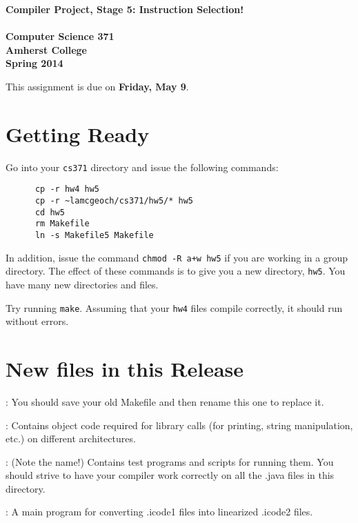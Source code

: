 \documentclass[11pt]{article}
\begin{document}
\begin{center}
\Large \bf Compiler Project, Stage 5: Instruction Selection!\\ \mbox{} \\
\large Computer Science 371 \\
\large Amherst College \\
\large Spring 2014
\end{center}

This assignment is due on {\bf Friday, May 9}.

\section{Getting Ready}

Go into your \verb'cs371' directory and issue the following commands:
\begin{verbatim}
      cp -r hw4 hw5          
      cp -r ~lamcgeoch/cs371/hw5/* hw5
      cd hw5
      rm Makefile
      ln -s Makefile5 Makefile
\end{verbatim}
In addition, issue the command \verb'chmod -R a+w hw5' if you are working in a group directory.
The effect of these commands is to give you a new directory, \verb'hw5'.  You have many new directories and files.

Try running \verb'make'.  Assuming that your \verb'hw4' files compile correctly, it should run without errors.

\section{New files in this Release}

\mbox{}\par{}: You should save your old Makefile and then rename this one to replace it.

\mbox{}\par{}:  Contains object code required for library calls (for printing, string manipulation, etc.) on different architectures.

\mbox{}\par{}:  (Note the name!)  Contains test programs and scripts for running them.  You should strive to have your compiler work correctly on all the .java files in this directory. 

\mbox{}\par{}:  A main program for converting .icode1 files into linearized .icode2 files.
\end{document}
